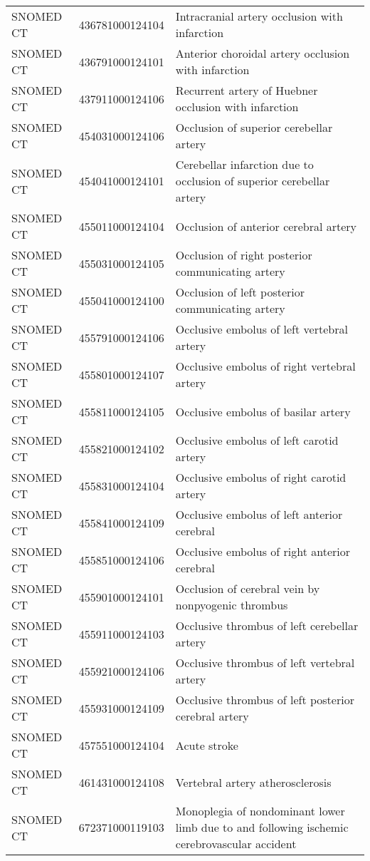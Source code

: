 \begin{longtable}{p{}p{}p{}}
  SNOMED CT & 436781000124104 & Intracranial artery occlusion with infarction \\ 
  SNOMED CT & 436791000124101 & Anterior choroidal artery occlusion with infarction \\ 
  SNOMED CT & 437911000124106 & Recurrent artery of Huebner occlusion with infarction \\ 
  SNOMED CT & 454031000124106 & Occlusion of superior cerebellar artery \\ 
  SNOMED CT & 454041000124101 & Cerebellar infarction due to occlusion of superior cerebellar artery \\ 
  SNOMED CT & 455011000124104 & Occlusion of anterior cerebral artery \\ 
  SNOMED CT & 455031000124105 & Occlusion of right posterior communicating artery \\ 
  SNOMED CT & 455041000124100 & Occlusion of left posterior communicating artery \\ 
  SNOMED CT & 455791000124106 & Occlusive embolus of left vertebral artery \\ 
  SNOMED CT & 455801000124107 & Occlusive embolus of right vertebral artery \\ 
  SNOMED CT & 455811000124105 & Occlusive embolus of basilar artery \\ 
  SNOMED CT & 455821000124102 & Occlusive embolus of left carotid artery \\ 
  SNOMED CT & 455831000124104 & Occlusive embolus of right carotid artery \\ 
  SNOMED CT & 455841000124109 & Occlusive embolus of left anterior cerebral \\ 
  SNOMED CT & 455851000124106 & Occlusive embolus of right anterior cerebral \\ 
  SNOMED CT & 455901000124101 & Occlusion of cerebral vein by nonpyogenic thrombus \\ 
  SNOMED CT & 455911000124103 & Occlusive thrombus of left cerebellar artery \\ 
  SNOMED CT & 455921000124106 & Occlusive thrombus of left vertebral artery \\ 
  SNOMED CT & 455931000124109 & Occlusive thrombus of left posterior cerebral artery \\ 
  SNOMED CT & 457551000124104 & Acute stroke \\ 
  SNOMED CT & 461431000124108 & Vertebral artery atherosclerosis \\ 
  SNOMED CT & 672371000119103 & Monoplegia of nondominant lower limb due to and following ischemic cerebrovascular accident \\ 

\end{longtable}
